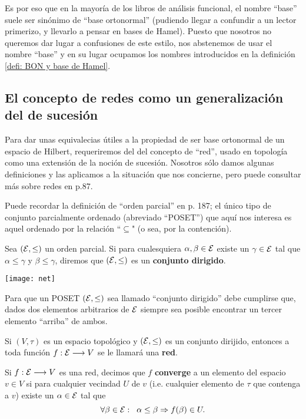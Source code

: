 Es por eso que en la mayoría
de los libros de análisis funcional, el nombre ``base''
suele ser sinónimo de 
``base ortonormal''
(pudiendo llegar a confundir
a un lector primerizo, y llevarlo a pensar en
bases de Hamel). Puesto que
nosotros no queremos dar lugar a confusiones de este estilo,
nos abstenemos de usar el nombre ``base'' y en su lugar ocupamos
los nombres introducidos en la definición \ref{defi: BON y base de Hamel}.

\subsection{El concepto de redes como un generalización del de sucesión}

Para dar unas equivalecias útiles a la propiedad de
ser base ortonormal de un espacio de Hilbert, requeriremos del
del concepto de ``red'', usado en topología como una extensión
de la noción de sucesión. Nosotros sólo damos algunas definiciones
y las aplicamos a la situación que nos concierne, pero puede
consultar más sobre redes en \cite{munkres} p.87.

Puede recordar la definición de ``orden parcial'' en 
\cite{munkres} p. 187; el único tipo de conjunto parcialmente
ordenado (abreviado ``POSET'') que aquí nos interesa es 
aquel ordenado por la relación ``$\subseteq$" (o sea, por la contención).
\begin{defi}
\label{def: conjunto dirijido}
Sea $(\mathcal{E}, \leq )$ un orden parcial. Si para cualesquiera
$\alpha, \beta \in \mathcal{E}$ existe un $\gamma \in \mathcal{E}$ tal que
$\alpha \leq \gamma$ y $\beta \leq \gamma$, diremos que 
$(\mathcal{E}, \leq)$ es un \textbf{conjunto dirigido}. 
\end{defi}

\begin{marginfigure}
\texttt{[image: net]} 
		\caption{Para que un POSET $(\mathcal{E}, \leq)$ sea llamado ``conjunto
		dirigido'' debe cumplirse que, dados dos elementos 
		arbitrarios de $\mathcal{E}$ siempre sea posible encontrar un tercer
		elemento ``arriba'' de ambos.}
\end{marginfigure}


\begin{defi}
Si $(V, \tau)$ es un espacio topológico y $(\mathcal{E}, \leq)$ es un conjunto
dirijido, entonces a toda función $f: \mathcal{E} \longrightarrow V$
se le llamará una \textbf{red}.
\end{defi}

\begin{defi}
\label{def: net que converge}
Si $f: \mathcal{E} \longrightarrow V$ es una red, decimos que $f$ 
\textbf{converge} a un elemento del espacio $v \in V$ si 
para cualquier vecindad $U$ de $v$ (i.e. cualquier elemento
de $\tau$ que contenga a $v$) existe un $\alpha \in \mathcal{E}$ tal que
\[
\forall \beta \in \mathcal{E}: \hspace{0.2cm} 
\alpha \leq \beta \Rightarrow f(\beta) \in U.
\]
\end{defi}




